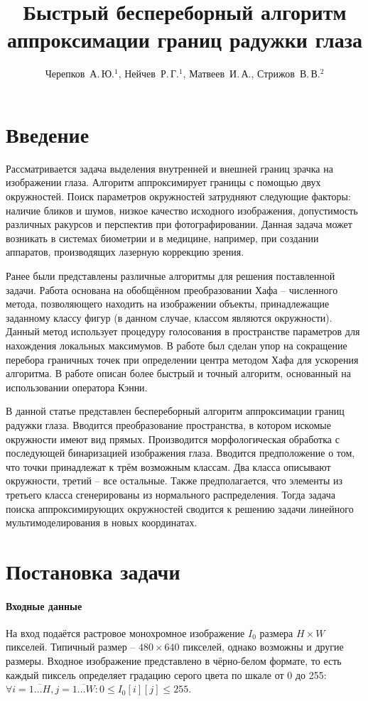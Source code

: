 \documentclass[12pt,twoside]{article}
\title
    [Алгоритм аппроксимации границ радужки глаза] %
    {Быстрый беспереборный алгоритм аппроксимации границ радужки глаза}
\author
    [Черепков~А.\,Ю., Нейчев~Р.\,Г.] %
    {Черепков~А.\,Ю.$^1$, Нейчев~Р.\,Г.$^1$, Матвеев~И.\,А., Стрижов~В.\,В.$^2$} %
\begin{document}
\maketitle
\section{Введение}
Рассматривается задача выделения внутренней и внешней границ зрачка на изображении глаза.  Алгоритм аппроксимирует границы с помощью двух окружностей. Поиск параметров окружностей затрудняют следующие факторы: наличие бликов и шумов, низкое качество исходного изображения, допустимость различных ракурсов и перспектив при фотографировании. Данная задача может возникать в системах биометрии и в медицине, например, при создании аппаратов, производящих лазерную коррекцию зрения.

Ранее были представлены различные алгоритмы для решения поставленной задачи. Работа \cite{Efimov2015} основана на обобщённом преобразовании Хафа -- численного метода, позволяющего находить на изображении объекты, принадлежащие заданному классу фигур (в данном случае, классом являются окружности). Данный метод использует процедуру голосования в пространстве параметров для нахождения локальных максимумов. В работе \cite{Efimov2015} был сделан упор на сокращение перебора граничных точек при определении центра методом Хафа для ускорения алгоритма. В работе \cite{Chigrinskiy2016} описан более быстрый и точный алгоритм, основанный на использовании оператора Кэнни.

В данной статье представлен беспереборный алгоритм аппроксимации границ радужки глаза. Вводится преобразование пространства, в котором искомые окружности имеют вид прямых. Производится морфологическая обработка с последующей бинаризацией изображения глаза. Вводится предположение о том, что точки принадлежат к трём возможным классам. Два класса описывают окружности, третий -- все остальные. Также предполагается, что элементы из третьего класса сгенерированы из нормального распределения. Тогда задача поиска аппроксимирующих окружностей сводится к решению задачи линейного мультимоделирования в новых координатах.

\section{Постановка задачи}
\paragraph{Входные данные}
На вход подаётся растровое монохромное изображение $I_0$ размера $H \times W$ пикселей. Типичный размер -- $480 \times 640$ пикселей, однако возможны и другие размеры. Входное изображение представлено в чёрно-белом формате, то есть каждый пиксель определяет градацию серого цвета по шкале от 0 до 255: $\forall i=\overline{1 \ldots H},  j = \overline{1 \ldots W}: 0\leqslant I_0[i][j] \leqslant 255$.
\end{document}
